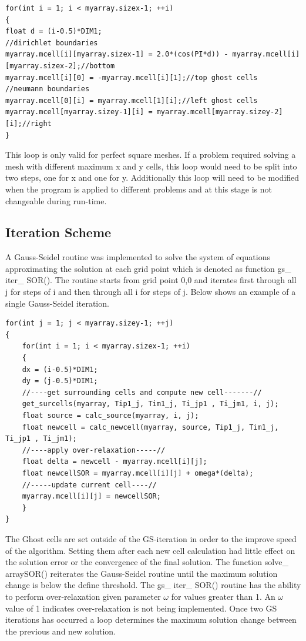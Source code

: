 \documentclass[paper=a4, fontsize=11pt, abstract=on]{scrartcl}
\numberwithin{equation}{section}		%
\numberwithin{figure}{section}			%
\numberwithin{table}{section}				%
\begin{document}
\begin{lstlisting}
for(int i = 1; i < myarray.sizex-1; ++i)
{
float d = (i-0.5)*DIM1;	
//dirichlet boundaries	
myarray.mcell[i][myarray.sizex-1] = 2.0*(cos(PI*d)) - myarray.mcell[i][myarray.sizex-2];//bottom
myarray.mcell[i][0] = -myarray.mcell[i][1];//top ghost cells 	
//neumann boundaries	
myarray.mcell[0][i] = myarray.mcell[1][i];//left ghost cells
myarray.mcell[myarray.sizey-1][i] = myarray.mcell[myarray.sizey-2][i];//right	
}
\end{lstlisting}
This loop is only valid for perfect square meshes. If a problem required solving a mesh with different maximum x and y cells, this loop would need to be split into two steps, one for x and one for y. Additionally this loop will need to be modified when the program is applied to different problems and at this stage is not changeable during run-time.
  
\subsection{Iteration Scheme}
A Gauss-Seidel routine was implemented to solve the system of equations approximating the solution at each grid point which is denoted as function gs\_ iter\_ SOR(). The routine starts from grid point 0,0 and iterates first through all j for steps of i and then through all i for steps of j. Below shows an example of a single Gauss-Seidel iteration.
\begin{lstlisting}
for(int j = 1; j < myarray.sizey-1; ++j)
{
	for(int i = 1; i < myarray.sizex-1; ++i)
	{	
	dx = (i-0.5)*DIM1;
	dy = (j-0.5)*DIM1;	
	//----get surrounding cells and compute new cell-------//
	get_surcells(myarray, Tip1_j, Tim1_j, Ti_jp1 , Ti_jm1, i, j);		
	float source = calc_source(myarray, i, j);
	float newcell = calc_newcell(myarray, source, Tip1_j, Tim1_j, Ti_jp1 , Ti_jm1); 	
	//----apply over-relaxation-----//
	float delta = newcell - myarray.mcell[i][j];
	float newcellSOR = myarray.mcell[i][j] + omega*(delta);	
	//-----update current cell----//
	myarray.mcell[i][j] = newcellSOR;
	}
}
\end{lstlisting}

The Ghost cells are set outside of the GS-iteration in order to the improve speed of the algorithm. Setting them after each new cell calculation had little effect on the solution error or the convergence of the final solution.  The function solve\_ arraySOR() reiterates the Gauss-Seidel routine until the maximum solution change is below the define threshold. The gs\_ iter\_ SOR() routine has the ability to perform over-relaxation given parameter $\omega$ for values greater than 1. An $\omega$ value of 1 indicates over-relaxation is not being implemented. Once two GS iterations has occurred a loop determines the maximum solution change between the previous and new solution. 
\end{document}
